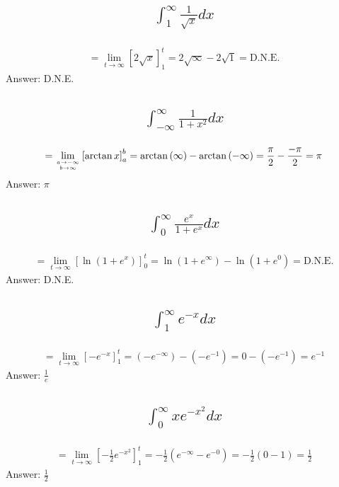 \documentclass{article}
\begin{document}
\subsection{
	\begin{align*}
		\int_1^\infty{\frac{1}{\sqrt{x}} dx}
	\end{align*}
}
\begin{align*}
	= \lim_{t \to \infty} \left[ 2\sqrt{x} \right]_1^t = 2\sqrt{\infty} - 2\sqrt{1} = \text{D.N.E.}
\end{align*}
Answer: D.N.E.

\subsection{
	\begin{align*}
		\int_{-\infty}^\infty{\frac{1}{1 + x^2} dx}
	\end{align*}
}
\begin{align*}
	= \lim_{{a \to -\infty \atop b \to \infty}} \left[ \arctan{x} \right]_a^b = \arctan{(\infty)} - \arctan{(-\infty)} = \frac{\pi}{2} - \frac{-\pi}{2} = \pi
\end{align*}
Answer: $\pi$

\subsection{
	\begin{align*}
		\int_0^\infty{\frac{e^x}{1 + e^x} dx}
	\end{align*}
}
\begin{align*}
	= \lim_{t \to \infty} \left[ \ln{(1 + e^x)} \right]_0^t = \ln{(1 + e^{\infty})} - \ln{(1 + e^0)} = \text{D.N.E.}
\end{align*}
Answer: D.N.E.

\subsection{
	\begin{align*}
		\int_1^\infty{e^{-x} dx}
	\end{align*}
}
\begin{align*}
	= \lim_{t \to \infty} \left[ -e^{-x} \right]_1^t = \left( -e^{-\infty} \right) - \left( -e^{-1} \right) = 0 - (-e^{-1}) = e^{-1}
\end{align*}
Answer: $\frac{1}{e}$

\subsection{
	\begin{align*}
		\int_0^\infty{xe^{-x^2} dx}
	\end{align*}
}
\begin{align*}
	= \lim_{t \to \infty} \left[ -\frac{1}{2}e^{-x^2} \right]_1^t = -\frac{1}{2} \left( e^{-\infty} - e^{-0} \right) = -\frac{1}{2} \left(0 - 1\right) = \frac{1}{2}
\end{align*}
Answer: $\frac{1}{2}$
\end{document}
